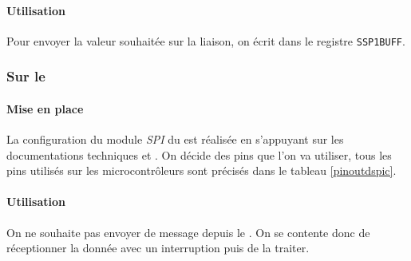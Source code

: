 			\paragraph{Utilisation} Pour envoyer la valeur souhaitée sur la liaison, on écrit dans le registre \texttt{SSP1BUFF}.
			\subsubsection{Sur le \dspic}
			\paragraph{Mise en place}La configuration du module \textit{SPI} du \dspic est réalisée en s'appuyant sur les documentations techniques \cite{DatasheetDSPIC} et \cite{DatasheetDSPIC30} . On décide des pins que l'on va utiliser, tous les pins utilisés sur les microcontrôleurs sont précisés dans le tableau \ref{pinoutdspic}.
			\paragraph{Utilisation} On ne souhaite pas envoyer de message depuis le \dspic. On se contente donc de réceptionner la donnée avec un interruption puis de la traiter.
